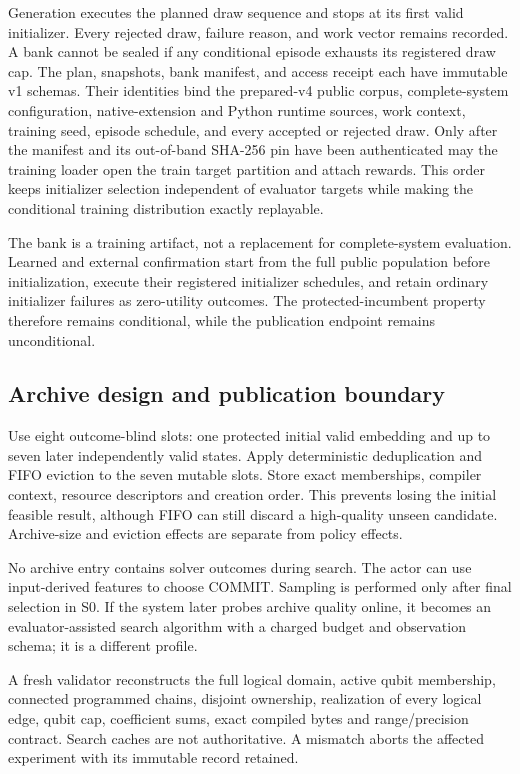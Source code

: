 \documentclass[11pt,a4paper]{article}
\theoremstyle{definition}\newtheorem{definition}[proposition]{Definition}
\begin{document}
Generation executes the planned draw sequence and stops at its first valid initializer. Every rejected draw, failure reason, and work vector remains recorded. A bank cannot be sealed if any conditional episode exhausts its registered draw cap. The plan, snapshots, bank manifest, and access receipt each have immutable v1 schemas. Their identities bind the prepared-v4 public corpus, complete-system configuration, native-extension and Python runtime sources, work context, training seed, episode schedule, and every accepted or rejected draw. Only after the manifest and its out-of-band SHA-256 pin have been authenticated may the training loader open the train target partition and attach rewards. This order keeps initializer selection independent of evaluator targets while making the conditional training distribution exactly replayable.

The bank is a training artifact, not a replacement for complete-system evaluation. Learned and external confirmation start from the full public population before initialization, execute their registered initializer schedules, and retain ordinary initializer failures as zero-utility outcomes. The protected-incumbent property therefore remains conditional, while the publication endpoint remains unconditional.

\subsection{Archive design and publication boundary}
Use eight outcome-blind slots: one protected initial valid embedding and up to seven later independently valid states. Apply deterministic deduplication and FIFO eviction to the seven mutable slots. Store exact memberships, compiler context, resource descriptors and creation order. This prevents losing the initial feasible result, although FIFO can still discard a high-quality unseen candidate. Archive-size and eviction effects are separate from policy effects.

No archive entry contains solver outcomes during search. The actor can use input-derived features to choose COMMIT. Sampling is performed only after final selection in S0. If the system later probes archive quality online, it becomes an evaluator-assisted search algorithm with a charged budget and observation schema; it is a different profile.

A fresh validator reconstructs the full logical domain, active qubit membership, connected programmed chains, disjoint ownership, realization of every logical edge, qubit cap, coefficient sums, exact compiled bytes and range/precision contract. Search caches are not authoritative. A mismatch aborts the affected experiment with its immutable record retained.
\end{document}
